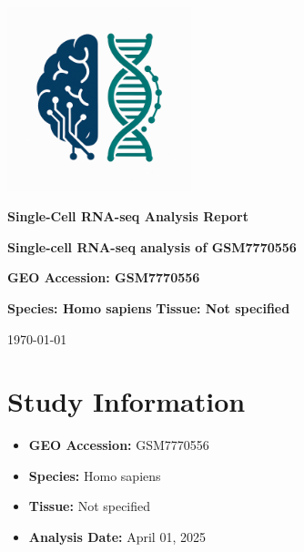 \documentclass[12pt]{article}
\begin{document}
\begin{titlepage}
    \centering
    \vspace*{2cm}

    \includegraphics[width=0.4\textwidth]{scagentic_logo.png}
    \vspace{1cm}

    \Huge\textbf{Single-Cell RNA-seq Analysis Report}
    \vspace{1cm}

    \Large\textbf{Single-cell RNA-seq analysis of GSM7770556}
    \vspace{0.5cm}

    \Large\textbf{GEO Accession: GSM7770556}
    \vspace{0.5cm}

    \Large\textbf{Species: Homo sapiens}
    \vspace{0.5cm}
    \Large\textbf{Tissue: Not specified}
    \vspace{1cm}

    \large\today
\end{titlepage}

\tableofcontents
\newpage

\section{Study Information}
\begin{itemize}
    \item \textbf{GEO Accession:} GSM7770556
    \item \textbf{Species:} Homo sapiens
    \item \textbf{Tissue:} Not specified
    \item \textbf{Analysis Date:} April 01, 2025
\end{itemize}

\end{document}
